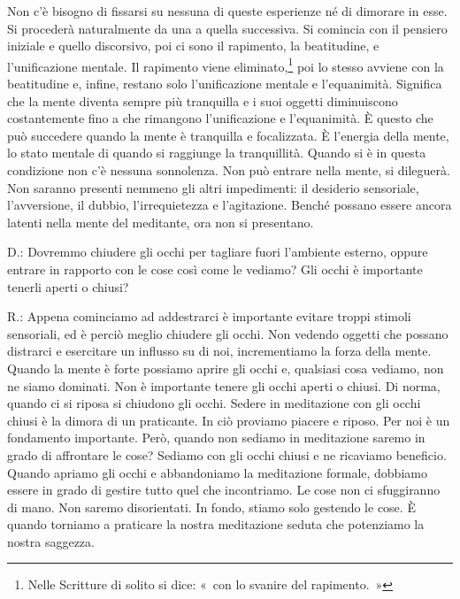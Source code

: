 Non c'è bisogno di fissarsi su nessuna di queste esperienze né di
dimorare in esse. Si procederà naturalmente da una a quella successiva.
Si comincia con il pensiero iniziale e quello discorsivo, poi ci sono il
rapimento, la beatitudine, e l'unificazione mentale. Il rapimento viene
eliminato,\footnote{Nelle Scritture di solito si dice: «~con lo svanire
  del rapimento.~»} poi lo stesso avviene con la beatitudine e, infine,
restano solo l'unificazione mentale e l'equanimità. Significa che la
mente diventa sempre più tranquilla e i suoi oggetti diminuiscono
costantemente fino a che rimangono l'unificazione e l'equanimità. È
questo che può succedere quando la mente è tranquilla e focalizzata. È
l'energia della mente, lo stato mentale di quando si raggiunge la
tranquillità. Quando si è in questa condizione non c'è nessuna
sonnolenza. Non può entrare nella mente, si dileguerà. Non saranno
presenti nemmeno gli altri impedimenti: il desiderio sensoriale,
l'avversione, il dubbio, l'irrequietezza e l'agitazione. Benché possano
essere ancora latenti nella mente del meditante, ora non si presentano.

D.: Dovremmo chiudere gli occhi per tagliare fuori l'ambiente esterno,
oppure entrare in rapporto con le cose così come le vediamo? Gli occhi è
importante tenerli aperti o chiusi?

R.: Appena cominciamo ad addestrarci è importante evitare troppi stimoli
sensoriali, ed è perciò meglio chiudere gli occhi. Non vedendo oggetti
che possano distrarci e esercitare un influsso su di noi, incrementiamo
la forza della mente. Quando la mente è forte possiamo aprire gli occhi
e, qualsiasi cosa vediamo, non ne siamo dominati. Non è importante
tenere gli occhi aperti o chiusi. Di norma, quando ci si riposa si
chiudono gli occhi. Sedere in meditazione con gli occhi chiusi è la
dimora di un praticante. In ciò proviamo piacere e riposo. Per noi è un
fondamento importante. Però, quando non sediamo in meditazione saremo in
grado di affrontare le cose? Sediamo con gli occhi chiusi e ne ricaviamo
beneficio. Quando apriamo gli occhi e abbandoniamo la meditazione
formale, dobbiamo essere in grado di gestire tutto quel che incontriamo.
Le cose non ci sfuggiranno di mano. Non saremo disorientati. In fondo,
stiamo solo gestendo le cose. È quando torniamo a praticare la nostra
meditazione seduta che potenziamo la nostra saggezza.

